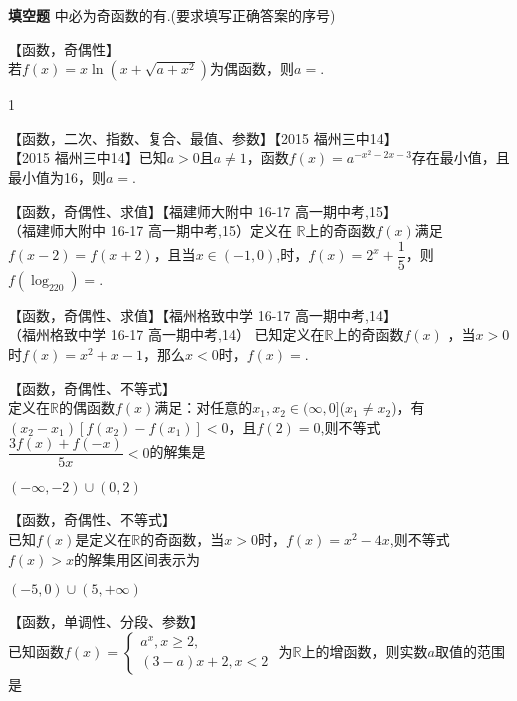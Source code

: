 \begin{exercise}{\bf 填空题}
      中必为奇函数的有\tk.(要求填写正确答案的序号)
      \begin{answer}
      \end{answer}
    \item 【函数，奇偶性】\\
      若$f(x)=x\ln (x+\sqrt{a+x^2})$为偶函数，则$ a= $\tk.
      \begin{answer}
        1
      \end{answer}
    \item 【函数，二次、指数、复合、最值、参数】【2015 福州三中14】\\
      【2015 福州三中14】已知$a>0$且$a\neq1$，函数$f(x)=a^{-x^2-2x-3}$存在最小值，且最小值为16，则$a=$\tk.
    \item 【函数，奇偶性、求值】【福建师大附中 16-17 高一期中考,15】\\
      （福建师大附中 16-17 高一期中考,15）定义在 $\mathbb{R}$上的奇函数$f(x)$满足 $f(x-2)=f(x+2)$，且当$x\in(-1,0)$,时，$f(x)=2^x+\dfrac15$，则$f(\log_220)=$\tk.
    \item 【函数，奇偶性、求值】【福州格致中学 16-17 高一期中考,14】\\
      （福州格致中学 16-17 高一期中考,14） 已知定义在$\mathbb{R}$上的奇函数$f(x)$ ，当$x>0$时$f(x)=x^2+x-1$，那么$x<0$时，$f(x)=$\tk.
    \item 【函数，奇偶性、不等式】\\
       定义在$\mathbb{R}$的偶函数$f(x)$满足：对任意的$x_1,x_2\in(\infty,0]$($x_1\neq x_2$)，有
      $(x_2-x_1)[f(x_2)-f(x_1)]<0$，且$f(2)=0$,则不等式$\dfrac{3f(x)+f(-x)}{5x}<0$的解集是\tk
      \begin{answer}
        $(-\infty,-2)\cup (0,2)$
      \end{answer}
    \item 【函数，奇偶性、不等式】\\
      已知$f(x)$是定义在$\mathbb{R}$的奇函数，当$x>0$时，$f(x)=x^2-4x$,则不等式$f(x)>x$的解集用区间表示为\tk
      \begin{answer}
        $(-5,0)\cup(5,+\infty)$
      \end{answer}
    \item 【函数，单调性、分段、参数】\\
      已知函数$f(x)=\begin{cases}
        a^x,x\geq 2,\\(3-a)x+2,x<2
      \end{cases}$
      为$\mathbb{R}$上的增函数，则实数$a$取值的范围是\tk
      \begin{answer}

\end{answer}
\end{exercise}

